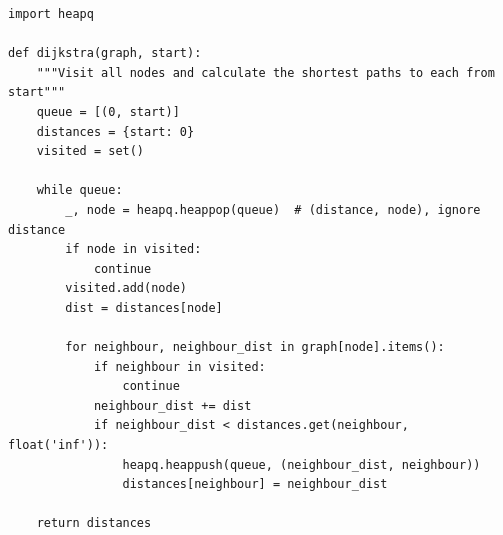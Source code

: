 \begin{lstlisting}[firstnumber=1, caption={Dijkstra's algorithm.}]
import heapq

def dijkstra(graph, start):
    """Visit all nodes and calculate the shortest paths to each from start"""
    queue = [(0, start)]
    distances = {start: 0}
    visited = set()

    while queue:
        _, node = heapq.heappop(queue)  # (distance, node), ignore distance
        if node in visited:
            continue
        visited.add(node)
        dist = distances[node]

        for neighbour, neighbour_dist in graph[node].items():
            if neighbour in visited:
                continue
            neighbour_dist += dist
            if neighbour_dist < distances.get(neighbour, float('inf')):
                heapq.heappush(queue, (neighbour_dist, neighbour))
                distances[neighbour] = neighbour_dist

    return distances
	
\end{lstlisting}
